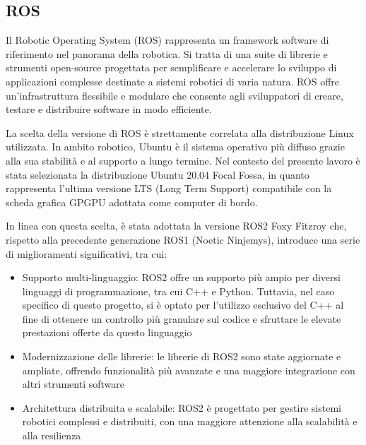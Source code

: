 \subsection{ROS} \label{ROS}

Il Robotic Operating System (ROS) rappresenta un framework software di riferimento nel panorama della robotica. Si tratta di una suite di librerie e strumenti open-source progettata per semplificare e accelerare lo sviluppo di applicazioni complesse destinate a sistemi robotici di varia natura. ROS offre un'infrastruttura flessibile e modulare che consente agli sviluppatori di creare, testare e distribuire software in modo efficiente.

\noindent La scelta della versione di ROS è strettamente correlata alla distribuzione Linux utilizzata. In ambito robotico, Ubuntu è il sistema operativo più diffuso grazie alla sua stabilità e al supporto a lungo termine. Nel contesto del presente lavoro è stata selezionata la distribuzione Ubuntu 20.04 Focal Fossa, in quanto rappresenta l'ultima versione LTS (Long Term Support) compatibile con la scheda grafica GPGPU adottata come computer di bordo.

\noindent In linea con questa scelta, è stata adottata la versione ROS2 Foxy Fitzroy che, rispetto alla precedente generazione ROS1 (Noetic Ninjemys), introduce una serie di miglioramenti significativi, tra cui:

\begin{itemize}
  \item Supporto multi-linguaggio: ROS2 offre un supporto più ampio per diversi linguaggi di programmazione, tra cui C++ e Python. Tuttavia, nel caso specifico di questo progetto, si è optato per l'utilizzo esclusivo del C++ al fine di ottenere un controllo più granulare sul codice e sfruttare le elevate prestazioni offerte da questo linguaggio
  \item Modernizzazione delle librerie: le librerie di ROS2 sono state aggiornate e ampliate, offrendo funzionalità più avanzate e una maggiore integrazione con altri strumenti software
  \item Architettura distribuita e scalabile: ROS2 è progettato per gestire sistemi robotici complessi e distribuiti, con una maggiore attenzione alla scalabilità e alla resilienza
\end{itemize}

